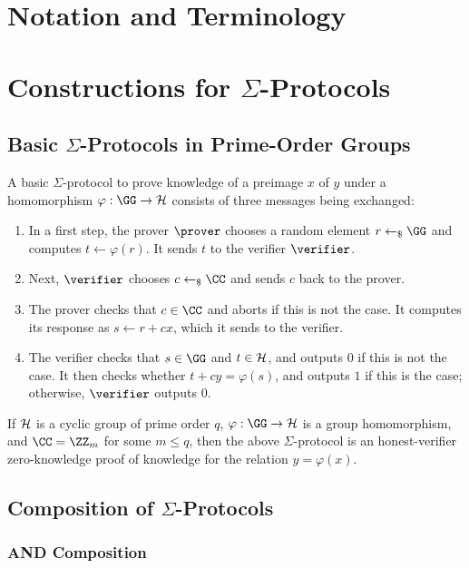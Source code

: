 \documentclass[runningheads]{llncs}
\begin{document}
\section{Notation and Terminology}

\section{Constructions for $\Sigma$-Protocols}
\subsection{Basic $\Sigma$-Protocols in Prime-Order Groups}
A basic $\Sigma$-protocol to prove knowledge of a preimage $x$ of $y$ under a homomorphism $\varphi:\GG\to\HH$ consists of three messages being exchanged:

\begin{enumerate}
  \item
    In a first step, the prover $\prover$ chooses a random element $r\getsr\GG$ and computes $t\gets\varphi(r)$.
	It sends $t$ to the verifier $\verifier$.
  \item
    Next, $\verifier$ chooses $c\getsr\CC$ and sends $c$ back to the prover.
  \item
    The prover checks that $c\in\CC$ and aborts if this is not the case.
	It computes its response as $s\gets r+cx$, which it sends to the verifier.
  \item
    The verifier checks that $s\in\GG$ and $t\in\mathcal{H}$, and outputs $0$ if this is not the case.
	It then checks whether $t + cy = \varphi(s)$, and outputs $1$ if this is the case; otherwise, $\verifier$ outputs $0$.
\end{enumerate}

\begin{theorem}
  If $\mathcal{H}$ is a cyclic group of prime order $q$, $\varphi:\GG\to\HH$ is a group homomorphism, and $\CC=\ZZ_m$ for some $m\leq q$, then the above $\Sigma$-protocol is an honest-verifier zero-knowledge proof of knowledge for the relation $y=\varphi(x)$.
\end{theorem}

\subsection{Composition of $\Sigma$-Protocols}
\subsubsection{AND Composition}
\end{document}
